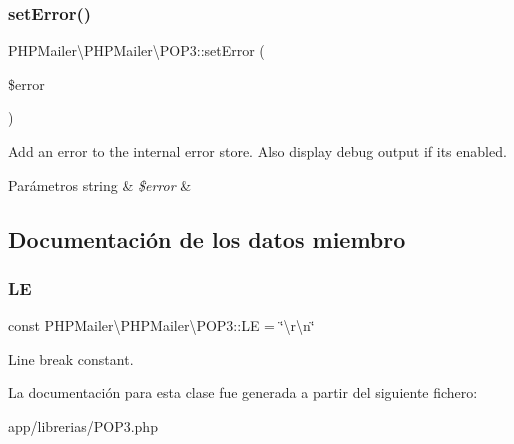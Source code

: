 \subsubsection{\texorpdfstring{set\+Error()}{setError()}}
{\footnotesize\ttfamily P\+H\+P\+Mailer\textbackslash{}\+P\+H\+P\+Mailer\textbackslash{}\+P\+O\+P3\+::set\+Error (\begin{DoxyParamCaption}\item[{}]{\$error }\end{DoxyParamCaption})\hspace{0.3cm}{\ttfamily [protected]}}

Add an error to the internal error store. Also display debug output if it\textquotesingle{}s enabled.


\begin{DoxyParams}[1]{Parámetros}
string & {\em \$error} & \\
\hline
\end{DoxyParams}


\subsection{Documentación de los datos miembro}
\mbox{\label{classPHPMailer_1_1PHPMailer_1_1POP3_aa250448fdb8ba74ce6f6900878c090fa}} 
\subsubsection{\texorpdfstring{LE}{LE}}
{\footnotesize\ttfamily const P\+H\+P\+Mailer\textbackslash{}\+P\+H\+P\+Mailer\textbackslash{}\+P\+O\+P3\+::\+LE = \char`\"{}\textbackslash{}r\textbackslash{}n\char`\"{}}

Line break constant. 

La documentación para esta clase fue generada a partir del siguiente fichero\+:\begin{DoxyCompactItemize}
\item 
app/librerias/P\+O\+P3.\+php\end{DoxyCompactItemize}

